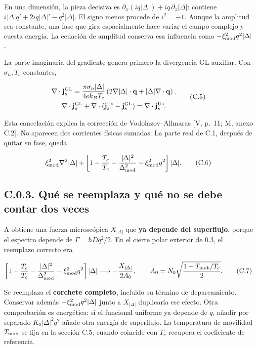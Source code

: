 \documentclass[
  spanish,
  10pt,
  a4paper,
]{article}
\begin{document}
En una dimensión, la pieza decisiva es
\(\partial_x(iq|\Delta|)+iq\,\partial_x|\Delta|\): contiene
\(i|\Delta|q'+2iq|\Delta|'-q^2|\Delta|\). El signo menos procede de
\(i^2=-1\). Aunque la amplitud sea constante, una fase que gira
espacialmente hace variar el campo complejo y cuesta energía. La
ecuación de amplitud conserva esa influencia como
\(-\xi_{\rm mod}^2q^2|\Delta|\).

La parte imaginaria del gradiente genera primero la divergencia GL
auxiliar. Con \(\sigma_n,T_c\) constantes,

\[
\begin{gathered}
\nabla\cdot\mathbf j_s^{\rm GL}
=\frac{\pi\sigma_n|\Delta|}{4ek_BT_c}
\left(2\nabla|\Delta|\cdot\mathbf q+|\Delta|\nabla\cdot\mathbf q\right),\\
\nabla\cdot\mathbf j_s^{\rm GL}
+\nabla\cdot(\mathbf j_s^{\rm Us}-\mathbf j_s^{\rm GL})
=\nabla\cdot\mathbf j_s^{\rm Us}.
\end{gathered}\tag{C.5}
\]

Esta cancelación explica la corrección de Vodolazov--Allmaras {[}V,
p.~11; M, anexo C.2{]}. No aparecen dos corrientes físicas sumadas. La
parte real de C.1, después de quitar su fase, queda

\[
\xi_{\rm mod}^2\nabla^2|\Delta|
+\left[1-\frac{T_e}{T_c}-\frac{|\Delta|^2}{\Delta_{\rm mod}^2}
-\xi_{\rm mod}^2q^2\right]|\Delta|.
\tag{C.6}
\]

\subsection{C.0.3. Qué se reemplaza y qué no se debe contar dos
veces}\label{c.0.3.-quuxe9-se-reemplaza-y-quuxe9-no-se-debe-contar-dos-veces}

A obtiene una fuerza microscópica \(X_{|\Delta|}\) que \textbf{ya
depende del superflujo}, porque el espectro depende de
\(\Gamma=\hbar Dq^2/2\). En el cierre polar exterior de 0.3, el
reemplazo correcto era

\[
\left[1-\frac{T_e}{T_c}-\frac{|\Delta|^2}{\Delta_{\rm mod}^2}
-\xi_{\rm mod}^2q^2\right]|\Delta|
\longrightarrow-\frac{X_{|\Delta|}}{2A_0},\qquad
A_0=N_0\sqrt{\frac{1+T_{\rm mob}/T_c}{2}}.
\tag{C.7}
\]

Se reemplaza el \textbf{corchete completo}, incluido su término de
depareamiento. Conservar además \(-\xi_{\rm mod}^2q^2|\Delta|\) junto a
\(X_{|\Delta|}\) duplicaría ese efecto. Otra comprobación es energética:
si el funcional uniforme ya depende de \(q\), añadir por separado
\(K_0|\Delta|^2q^2\) añade otra energía de superflujo. La temperatura de
movilidad \(T_{\rm mob}\) se fija en la sección C.5; cuando coincide con
\(T_e\) recupera el coeficiente de referencia.
\end{document}
